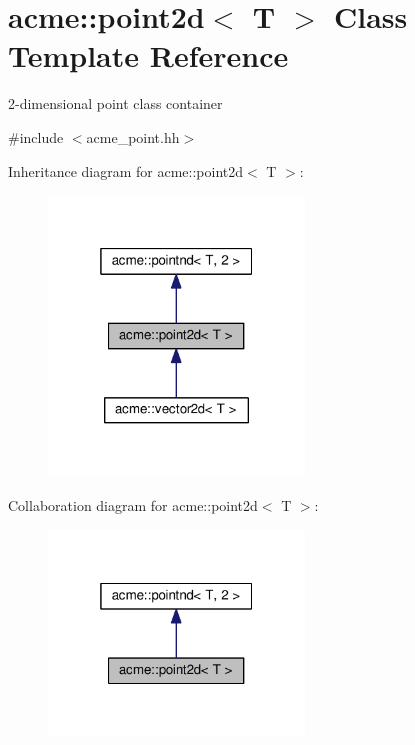 \hypertarget{classacme_1_1point2d}{}\section{acme\+:\+:point2d$<$ T $>$ Class Template Reference}
\label{classacme_1_1point2d}


2-\/dimensional point class container  




{\ttfamily \#include $<$acme\+\_\+point.\+hh$>$}



Inheritance diagram for acme\+:\+:point2d$<$ T $>$\+:
\nopagebreak
\begin{figure}[H]
\begin{center}
\leavevmode
\includegraphics[width=193pt]{d9/d99/classacme_1_1point2d__inherit__graph}
\end{center}
\end{figure}


Collaboration diagram for acme\+:\+:point2d$<$ T $>$\+:
\nopagebreak
\begin{figure}[H]
\begin{center}
\leavevmode
\includegraphics[width=193pt]{d9/da9/classacme_1_1point2d__coll__graph}
\end{center}
\end{figure}
